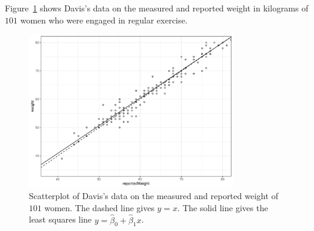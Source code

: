 Figure~\ref{fig:updatedWeights} shows Davis's data on the measured and reported weight in kilograms of $101$ women who were engaged in regular exercise.
\begin{figure}[H]
\begin{center}
  \includegraphics[width=0.8\textwidth]{Lecture3/figure_5_1.pdf}
  \caption{Scatterplot of Davis's data on the measured and reported weight of $101$ women.  The dashed line gives $y = x$.  The solid line gives the least squares line $y = \hat{\beta}_0 + \hat{\beta}_1 x$.}
  \label{fig:updatedWeights}
\end{center}
\end{figure}


